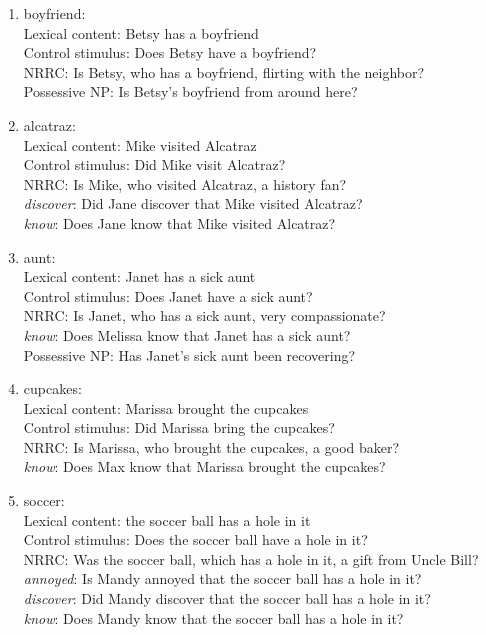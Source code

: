 \documentclass[11pt,fleqn]{article}
\newcommand{\6}{\mbox{$[\hspace*{-.6mm}[$}}
\newcommand{\9}{\mbox{$]\hspace*{-.6mm}]$}}
\begin{document}
\begin{enumerate}
\item boyfriend:  \\
     Lexical content: Betsy has a boyfriend\\
     Control stimulus: Does Betsy have a boyfriend?\\
     NRRC: Is Betsy, who has a boyfriend, flirting with the neighbor?\\
     Possessive NP: Is Betsy's boyfriend from around here?

\item alcatraz:  \\
     Lexical content: Mike visited Alcatraz\\
     Control stimulus: Did Mike visit Alcatraz?\\
     NRRC: Is Mike, who visited Alcatraz, a history fan?\\
     {\em discover}: Did Jane discover that Mike visited Alcatraz?\\
     {\em know}: Does Jane know that Mike visited Alcatraz?

\item aunt:  \\
     Lexical content: Janet has a sick aunt\\
     Control stimulus: Does Janet have a sick aunt?\\
     NRRC: Is Janet, who has a sick aunt, very compassionate?\\
     {\em know}: Does Melissa know that Janet has a sick aunt?\\
     Possessive NP: Has Janet's sick aunt been recovering?

\item cupcakes:  \\
     Lexical content: Marissa brought the cupcakes\\
     Control stimulus: Did Marissa bring the cupcakes?\\
     NRRC: Is Marissa, who brought the cupcakes, a good baker?\\
     {\em know}: Does Max know that Marissa brought the cupcakes?

\item soccer:  \\
     Lexical content: the soccer ball has a hole in it\\
     Control stimulus: Does the soccer ball have a hole in it?\\
     NRRC: Was the soccer ball, which has a hole in it, a gift from Uncle Bill?\\
     {\em annoyed}: Is Mandy annoyed that the soccer ball has a hole in it?\\
     {\em discover}: Did Mandy discover that the soccer ball has a hole in it?\\
     {\em know}: Does Mandy know that the soccer ball has a hole in it?


\end{enumerate}
\end{document}
